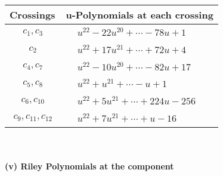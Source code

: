 \documentclass[1p]{elsarticle_modified}
\theoremstyle{definition}
\begin{document}
\begin{tabular}{m{50pt}|m{274pt}}
Crossings & \hspace{64pt}u-Polynomials at each crossing \\
\hline $$\begin{aligned}c_{1},c_{3}\end{aligned}$$&$\begin{aligned}
&u^{22}-22 u^{20}+\cdots-78 u+1
\end{aligned}$\\
\hline $$\begin{aligned}c_{2}\end{aligned}$$&$\begin{aligned}
&u^{22}+17 u^{21}+\cdots+72 u+4
\end{aligned}$\\
\hline $$\begin{aligned}c_{4},c_{7}\end{aligned}$$&$\begin{aligned}
&u^{22}-10 u^{20}+\cdots-82 u+17
\end{aligned}$\\
\hline $$\begin{aligned}c_{5},c_{8}\end{aligned}$$&$\begin{aligned}
&u^{22}+u^{21}+\cdots- u+1
\end{aligned}$\\
\hline $$\begin{aligned}c_{6},c_{10}\end{aligned}$$&$\begin{aligned}
&u^{22}+5 u^{21}+\cdots+224 u-256
\end{aligned}$\\
\hline $$\begin{aligned}c_{9},c_{11},c_{12}\end{aligned}$$&$\begin{aligned}
&u^{22}+7 u^{21}+\cdots+u-16
\end{aligned}$\\
\hline
\end{tabular}\\~\\
\newpage\renewcommand{\arraystretch}{1}
\flushleft \textbf{(v) Riley Polynomials at the component}\newline \\
\end{document}
